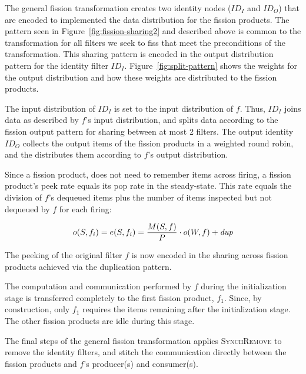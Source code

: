 The general fission transformation creates two identity nodes ($ID_I$
and $ID_O$) that are encoded to implemented the data distribution for
the fission products.  The pattern seen in
Figure~\ref{fig:fission-sharing2} and described above is common to the
transformation for all filters we seek to fiss that meet the
preconditions of the transformation.  This sharing pattern is encoded
in the output distribution pattern for the identity filter $ID_I$.
Figure~\ref{fig:split-pattern} shows the weights for the output
distribution and how these weights are distributed to the fission
products.

The input distribution of $ID_I$ is set to the input distribution of
$f$.  Thus, $ID_I$ joins data as described by $f$'s input
distribution, and splits data according to the fission output pattern
for sharing between at most 2 filters.  The output identity $ID_O$
collects the output items of the fission products in a weighted round
robin, and the distributes them according to $f$'s output distribution.

Since a fission product, does not need to remember items across
firing, a fission product's peek rate equals its pop rate in the
steady-state.  This rate equals the division of $f$'s dequeued
items plus the number of items inspected but not dequeued by $f$ for
each firing:   

\[ o(S,f_i) = e(S, f_i) = \frac{M(S, f)}{P} \cdot o(W, f) + \mbox{\it dup} \]

\noindent The peeking of the original filter $f$ is now encoded in
the sharing across fission products achieved via the duplication
pattern.

The computation and communication performed by $f$ during the
initialization stage is transferred completely to the first fission
product, $f_1$.  Since, by construction, only $f_1$ requires the items
remaining after the initialization stage.  The other fission products
are idle during this stage.

The final steps of the general fission transformation applies
\textsc{SynchRemove} to remove the identity filters, and stitch the
communication directly between the fission products and $f$'s
producer(s) and consumer(s).
